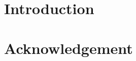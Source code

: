 \documentclass[12pt]{report}
\begin{document}

% 
% 


\tableofcontents
\newpage
\listoffigures
\newpage
\listoftables
\newpage

\chapter{Introduction}




\chapter{Acknowledgement}


\renewcommand{\bibname}{References}

%


\end{document}
